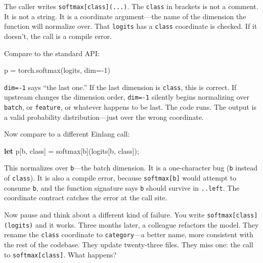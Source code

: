 \documentclass[11pt,titlepage]{article}
\newenvironment{Shaded}{}{}
\newcommand{\DecValTok}[1]{\textcolor[rgb]{0.25,0.63,0.44}{#1}}
\newcommand{\KeywordTok}[1]{\textcolor[rgb]{0.00,0.44,0.13}{\textbf{#1}}}
\newcommand{\NormalTok}[1]{#1}
\newcommand{\OperatorTok}[1]{\textcolor[rgb]{0.40,0.40,0.40}{#1}}
\begin{document}
The caller writes \texttt{softmax{[}class{]}(...)}. The \texttt{class}
in brackets is not a comment. It is not a string. It is a coordinate
argument---the name of the dimension the function will normalize over.
That \texttt{logits} has a \texttt{class} coordinate is checked. If it
doesn't, the call is a compile error.

Compare to the standard API:

\begin{Shaded}
\begin{Highlighting}[]
\NormalTok{p }\OperatorTok{=}\NormalTok{ torch.softmax(logits, dim}\OperatorTok{=-}\DecValTok{1}\NormalTok{)}
\end{Highlighting}
\end{Shaded}

\texttt{dim=-1} says ``the last one.'' If the last dimension is
\texttt{class}, this is correct. If upstream changes the dimension
order, \texttt{dim=-1} silently begins normalizing over \texttt{batch},
or \texttt{feature}, or whatever happens to be last. The code runs. The
output is a valid probability distribution---just over the wrong
coordinate.

Now compare to a different Einlang call:

\begin{Shaded}
\begin{Highlighting}[]
\KeywordTok{let}\NormalTok{ p}\OperatorTok{[}\NormalTok{b, class}\OperatorTok{]}\NormalTok{ = softmax}\OperatorTok{[}\NormalTok{b}\OperatorTok{]}\NormalTok{(logits}\OperatorTok{[}\NormalTok{b, class}\OperatorTok{]}\NormalTok{);}
\end{Highlighting}
\end{Shaded}

This normalizes over \texttt{b}---the batch dimension. It is a
one-character bug (\texttt{b} instead of \texttt{class}). It is also a
compile error, because \texttt{softmax{[}b{]}} would attempt to consume
\texttt{b}, and the function signature says \texttt{b} should survive in
\texttt{..left}. The coordinate contract catches the error at the call
site.

Now pause and think about a different kind of failure. You write
\texttt{softmax{[}class{]}(logits)} and it works. Three months later, a
colleague refactors the model. They rename the \texttt{class} coordinate
to \texttt{category}---a better name, more consistent with the rest of
the codebase. They update twenty-three files. They miss one: the call to
\texttt{softmax{[}class{]}}. What happens?
\end{document}
